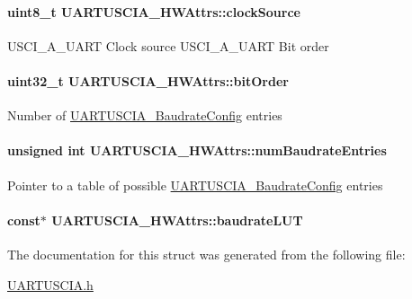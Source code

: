 \paragraph[{clock\-Source}]{\setlength{\rightskip}{0pt plus 5cm}uint8\-\_\-t U\-A\-R\-T\-U\-S\-C\-I\-A\-\_\-\-H\-W\-Attrs\-::clock\-Source}\label{struct_u_a_r_t_u_s_c_i_a___h_w_attrs_a4aec72a0ebaedd4a4972448aa01a2250}
U\-S\-C\-I\-\_\-\-A\-\_\-\-U\-A\-R\-T Clock source U\-S\-C\-I\-\_\-\-A\-\_\-\-U\-A\-R\-T Bit order 
\paragraph[{bit\-Order}]{\setlength{\rightskip}{0pt plus 5cm}uint32\-\_\-t U\-A\-R\-T\-U\-S\-C\-I\-A\-\_\-\-H\-W\-Attrs\-::bit\-Order}\label{struct_u_a_r_t_u_s_c_i_a___h_w_attrs_ac37864896a2d13ca7989076a125f1bd0}
Number of \hyperlink{struct_u_a_r_t_u_s_c_i_a___baudrate_config}{U\-A\-R\-T\-U\-S\-C\-I\-A\-\_\-\-Baudrate\-Config} entries 
\paragraph[{num\-Baudrate\-Entries}]{\setlength{\rightskip}{0pt plus 5cm}unsigned int U\-A\-R\-T\-U\-S\-C\-I\-A\-\_\-\-H\-W\-Attrs\-::num\-Baudrate\-Entries}\label{struct_u_a_r_t_u_s_c_i_a___h_w_attrs_ae73e37878acb0ca3f0c5b4209af6dc55}
Pointer to a table of possible \hyperlink{struct_u_a_r_t_u_s_c_i_a___baudrate_config}{U\-A\-R\-T\-U\-S\-C\-I\-A\-\_\-\-Baudrate\-Config} entries 
\paragraph[{baudrate\-L\-U\-T}]{ const$\ast$ U\-A\-R\-T\-U\-S\-C\-I\-A\-\_\-\-H\-W\-Attrs\-::baudrate\-L\-U\-T}\label{struct_u_a_r_t_u_s_c_i_a___h_w_attrs_a5c2588fa1527626c8c6711f825cc96bd}


The documentation for this struct was generated from the following file\-:\begin{DoxyCompactItemize}
\item 
\hyperlink{_u_a_r_t_u_s_c_i_a_8h}{U\-A\-R\-T\-U\-S\-C\-I\-A.\-h}\end{DoxyCompactItemize}
